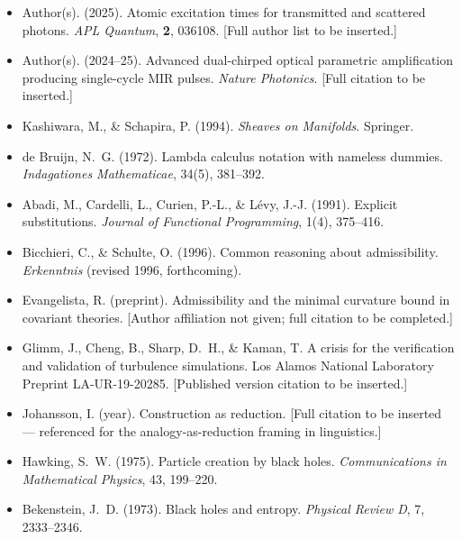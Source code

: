 \documentclass[12pt, a4paper]{article}
\theoremstyle{plain}
\theoremstyle{definition}
\theoremstyle{remark}
\begin{document}
\begin{itemize}[leftmargin=1.8em, itemsep=0.4em]
  \item [APL Quantum] Author(s). (2025). Atomic excitation times
        for transmitted and scattered photons.
        \textit{APL Quantum}, \textbf{2}, 036108.
        [Full author list to be inserted.]

  \item [Nature Photonics DC-OPA] Author(s). (2024--25).
        Advanced dual-chirped optical parametric amplification
        producing single-cycle MIR pulses.
        \textit{Nature Photonics}.
        [Full citation to be inserted.]

  \item Kashiwara, M., \& Schapira, P. (1994).
        \textit{Sheaves on Manifolds}. Springer.

  \item de Bruijn, N.~G. (1972). Lambda calculus notation with
        nameless dummies. \textit{Indagationes Mathematicae},
        34(5), 381--392.

  \item Abadi, M., Cardelli, L., Curien, P.-L., \& Lévy, J.-J.
        (1991). Explicit substitutions. \textit{Journal of Functional
        Programming}, 1(4), 375--416.

  \item Bicchieri, C., \& Schulte, O. (1996). Common reasoning about
        admissibility. \textit{Erkenntnis} (revised 1996, forthcoming).

  \item Evangelista, R. (preprint). Admissibility and the minimal
        curvature bound in covariant theories. [Author affiliation not
        given; full citation to be completed.]

  \item Glimm, J., Cheng, B., Sharp, D.~H., \& Kaman, T.
        A crisis for the verification and validation of turbulence
        simulations. Los Alamos National Laboratory Preprint
        LA-UR-19-20285. [Published version citation to be inserted.]

  \item Johansson, I. (year). Construction as reduction.
        [Full citation to be inserted --- referenced for the analogy-as-reduction
        framing in linguistics.]

  \item Hawking, S.~W. (1975). Particle creation by black holes.
        \textit{Communications in Mathematical Physics}, 43, 199--220.

  \item Bekenstein, J.~D. (1973). Black holes and entropy.
        \textit{Physical Review D}, 7, 2333--2346.


\end{itemize}
\end{document}
